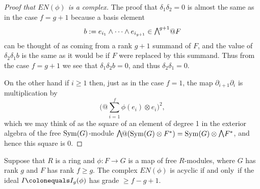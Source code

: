 \begin{proof}[Proof that $EN(\phi)$ is a complex]
 The proof that $\delta_{1}\delta_{2} = 0$ is almost the same as in the
case $f = g+1$ because
a basis element
$$
b: = e_{i_{1}}\wedge \cdots \wedge e_{i_{g+1}} \in \mwedge^{g+1}@F
$$
can be thought of as coming from a rank $g+1$ summand of $F$, and the
value of $\delta_{2}\delta_{1}b$
is the same as it would be if $F$ were replaced by this summand. Thus
from the case $f=g+1$ we see
that $\delta_{1}\delta_{2}b = 0$, and thus $\delta_{2}\delta_{1} = 0$.

On the other hand if $i\geq 1$ then, just as in the case $f=1$,
 the map $\partial_{i+1}\partial_{i}$
is multiplication by
$$
\biggl(@\sum_{i = 1}^{f} \phi(e_{i}) \otimes \hat e_{i}\biggr)^{\!2},
$$
which we may think of as the square of an element of degree 1 in the
exterior algebra
of the free $\operatorname{Sym}(G)$-module $\mwedge@(\Sym(G)\otimes F^{*}) = \Sym(G)
\otimes \mwedge \,F^{*}$, and hence this square is 0.
\end{proof}




\begin{theorem}\label{ENgeneral}
Suppose that $R$ is a ring and $\phi: F\to G$ is a map of  free
$R$-modules,
where $G$ has rank $g$ and $F$ has rank $f \geq g$.
The complex $EN(\phi)$ is acyclic if and only~if the ideal 
%
$I \colonequals  I_{g}(\phi)$ has 
%
grade $\geq f-g+1$.
\end{theorem}

